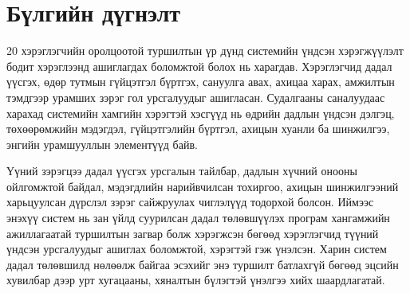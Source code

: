\section{Бүлгийн дүгнэлт}

20 хэрэглэгчийн оролцоотой туршилтын үр дүнд системийн үндсэн хэрэгжүүлэлт бодит хэрэглээнд ашиглагдах боломжтой болох нь харагдав. Хэрэглэгчид дадал үүсгэх, өдөр тутмын гүйцэтгэл бүртгэх, сануулга авах, ахицаа харах, амжилтын тэмдгээр урамших зэрэг гол урсгалуудыг ашигласан. Судалгааны саналуудаас харахад системийн хамгийн хэрэгтэй хэсгүүд нь өдрийн дадлын үндсэн дэлгэц, төхөөрөмжийн мэдэгдэл, гүйцэтгэлийн бүртгэл, ахицын хуанли ба шинжилгээ, энгийн урамшууллын элементүүд байв.

Үүний зэрэгцээ дадал үүсгэх урсгалын тайлбар, дадлын хүчний онооны ойлгомжтой байдал, мэдэгдлийн нарийвчилсан тохиргоо, ахицын шинжилгээний харьцуулсан дүрслэл зэрэг сайжруулах чиглэлүүд тодорхой болсон. Иймээс энэхүү систем нь зан үйлд суурилсан дадал төлөвшүүлэх програм хангамжийн ажиллагаатай туршилтын загвар болж хэрэгжсэн бөгөөд хэрэглэгчид түүний үндсэн урсгалуудыг ашиглах боломжтой, хэрэгтэй гэж үнэлсэн. Харин систем дадал төлөвшилд нөлөөлж байгаа эсэхийг энэ туршилт батлахгүй бөгөөд эцсийн хувилбар дээр урт хугацааны, хяналтын бүлэгтэй үнэлгээ хийх шаардлагатай.



